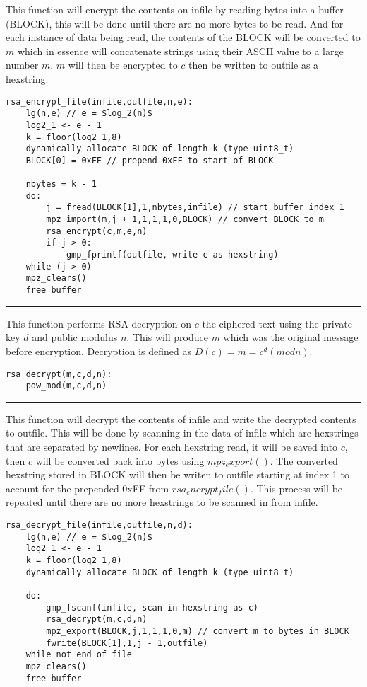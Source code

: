 \documentclass[
	12pt, %
]{fphw}
\begin{document}
This function will encrypt the contents on infile by reading bytes into a buffer (BLOCK), this will be done until there are no more bytes to be read. And for each instance of data being read, the contents of the BLOCK will be converted to $m$ which in essence will concatenate strings using their ASCII value to a large number $m$. $m$ will then be encrypted to $c$ then be written to outfile as a hexstring.
\begin{lstlisting}[mathescape=true]
rsa_encrypt_file(infile,outfile,n,e):
	lg(n,e) // e = $log_2(n)$
	log2_1 <- e - 1
	k = floor(log2_1,8)
	dynamically allocate BLOCK of length k (type uint8_t)
	BLOCK[0] = 0xFF // prepend 0xFF to start of BLOCK
	
	nbytes = k - 1
	do:
		j = fread(BLOCK[1],1,nbytes,infile) // start buffer index 1
		mpz_import(m,j + 1,1,1,1,0,BLOCK) // convert BLOCK to m
		rsa_encrypt(c,m,e,n)
		if j > 0:
			gmp_fprintf(outfile, write c as hexstring)
	while (j > 0)
	mpz_clears()
	free buffer
\end{lstlisting}

\noindent\rule{6.3in}{0.4pt}

This function performs RSA decryption on $c$ the ciphered text using the private key $d$ and public modulus $n$. This will produce $m$ which was the original message before encryption. Decryption is defined as $D(c) = m = c^d (mod n)$.
\begin{lstlisting}[mathescape=true]
rsa_decrypt(m,c,d,n):
	pow_mod(m,c,d,n)
\end{lstlisting}

\noindent\rule{6.3in}{0.4pt}

This function will decrypt the contents of infile and write the decrypted contents to outfile. This will be done by scanning in the data of infile which are hexstrings that are separated by newlines. For each hexstring read, it will be saved into $c$, then $c$ will be converted back into bytes using $mpz_export()$. The converted hexstring stored in BLOCK will then be writen to outfile starting at index 1 to account for the prepended 0xFF from $rsa_encrypt_file()$. This process will be repeated until there are no more hexstrings to be scanned in from infile.
\begin{lstlisting}[mathescape=true]
rsa_decrypt_file(infile,outfile,n,d):
	lg(n,e) // e = $log_2(n)$
	log2_1 <- e - 1
	k = floor(log2_1,8)
	dynamically allocate BLOCK of length k (type uint8_t)
	
	do:
		gmp_fscanf(infile, scan in hexstring as c)
		rsa_decrypt(m,c,d,n)
		mpz_export(BLOCK,j,1,1,1,0,m) // convert m to bytes in BLOCK
		fwrite(BLOCK[1],1,j - 1,outfile)
	while not end of file
	mpz_clears()
	free buffer
\end{lstlisting}
\end{document}
